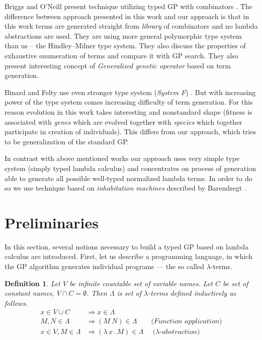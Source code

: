\documentclass[conference]{IEEEtran}
\newtheorem{definition}{Definition}
\newcommand{\lets}{let us\xspace}
\newcommand{\lterms}{$\lambda$-terms\xspace}
\newcommand{\then}{\Rightarrow\xspace}
\newcommand{\lamb}[2]{( \lambda \, #1 \, . \, #2 )}
\begin{document}
Briggs and O’Neill present technique 
utilizing typed GP with combinators \cite{kes}.
The difference between approach presented in this work
and our approach is that in this work terms are generated
straight from \textit{library} of combinators and no lambda abstractions
are used. They are using more general polymorphic type system than us
-- the Hindley–Milner type system. They also discuss the 
properties of exhaustive enumeration of terms and compare it with GP search.  
They also present interesting concept of \textit{Generalized
genetic operator} based on term generation. 

Binard and Felty use even 
stronger type system (\textit{System F}) \cite{binard2008genetic}.  
But with increasing power of the type system comes increasing difficulty of term generation.
For this reason evolution in this work takes interesting and nonstandard shape 
(fitness is associated with \textit{genes} which are evolved together with \textit{species}
which together participate in creation of individuals).
This differs from our approach, which tries to be generalization of
the standard GP\cite{koza92}.

In contrast with above mentioned works our approach uses very simple type system 
(simply typed lambda calculus) and concentrates on process of generation  
able to generate all possible well-typed normalized lambda terms. In order to do
so we use technique based on \textit{inhabitation machines} 
described by Barendregt \cite{barendregt10}.    


\section{Preliminaries}
\label{preliminaries}

In this section, several notions necessary to build a typed GP based on lambda calculus are introduced. 
First, \lets describe a programming language, 
in which the GP algorithm generates individual programs --- the so called \lterms.\\

\begin{definition}
Let $V$ be infinite countable set of {\it 
variable names}. Let $C$ be set of {\it constant names}, 
$V \cap C = \emptyset$.	 	
Then $\Lambda$ is set of {\it \lterms} defined inductively as follows.	
\begin{align*}
x   \in V \cup C  &\then x     \in \Lambda \\
M,N \in \Lambda   &\then (M~N) \in \Lambda 
\textit{~~~~~~(Function application)} \\
x   \in V , M \in \Lambda &\then \lamb{x}{M} \in \Lambda
\textit{~~~~($\lambda$-abstraction)} 
\end{align*}
\end{definition}
~\\
\end{document}

